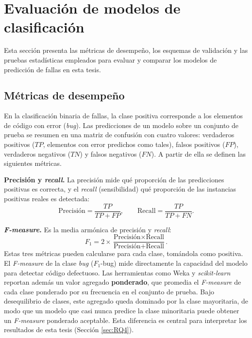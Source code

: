 \section{Evaluación de modelos de clasificación}

Esta sección presenta las métricas de desempeño, los esquemas de validación y las pruebas estadísticas empleados para evaluar y comparar los modelos de predicción de fallas en esta tesis.

\subsection{Métricas de desempeño}
\label{sec:metricas_evaluacion}

En la clasificación binaria de fallas, la clase positiva corresponde a los elementos de código con error (\textit{bug}). Las predicciones de un modelo sobre un conjunto de prueba se resumen en una matriz de confusión con cuatro valores: verdaderos positivos ($TP$, elementos con error predichos como tales), falsos positivos ($FP$), verdaderos negativos ($TN$) y falsos negativos ($FN$). A partir de ella se definen las siguientes métricas.

\textbf{Precisión y \textit{recall}.} La precisión mide qué proporción de las predicciones positivas es correcta, y el \textit{recall} (sensibilidad) qué proporción de las instancias positivas reales es detectada:
\begin{equation}
\text{Precisión} = \frac{TP}{TP + FP}, \qquad \text{Recall} = \frac{TP}{TP + FN}.
\label{eq:precision_recall}
\end{equation}

\textbf{\textit{F-measure}.} Es la media armónica de precisión y \textit{recall}:
\begin{equation}
F_{1} = 2 \times \frac{\text{Precisión} \times \text{Recall}}{\text{Precisión} + \text{Recall}}.
\label{eq:f1}
\end{equation}
Estas tres métricas pueden calcularse para cada clase, tomándola como positiva. El \textit{F-measure} de la clase \textit{bug} ($F_{1}$-bug) mide directamente la capacidad del modelo para detectar código defectuoso. Las herramientas como Weka y \textit{scikit-learn} reportan además un valor agregado \textbf{ponderado}, que promedia el \textit{F-measure} de cada clase ponderado por su frecuencia en el conjunto de prueba. Bajo desequilibrio de clases, este agregado queda dominado por la clase mayoritaria, de modo que un modelo que casi nunca predice la clase minoritaria puede obtener un \textit{F-measure} ponderado aceptable. Esta diferencia es central para interpretar los resultados de esta tesis (Sección \ref{sec:RQ4}).

